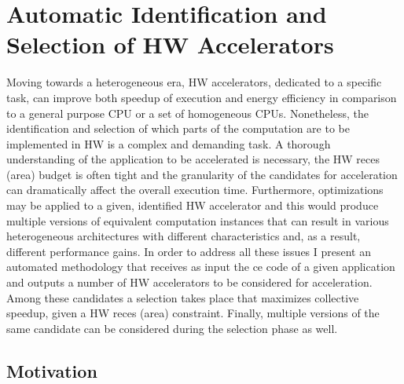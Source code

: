 \documentclass[]{usiinfthesis}
\begin{document}

%
%
%
%
%  
%
%
%
%
%

\chapter%
{Automatic Identification and Selection of HW Accelerators}

Moving towards a heterogeneous era, HW accelerators, dedicated to a specific task, can
improve both speedup of execution and energy efficiency in comparison to a general 
purpose CPU or a set of homogeneous CPUs. Nonetheless, the identification and selection 
of which parts of the computation are to be implemented in HW is a complex and demanding task. 
A thorough understanding of the application to be accelerated is necessary, the HW reces
(area) budget is often tight and the granularity of the candidates for acceleration 
can dramatically affect the overall execution time. Furthermore, optimizations may be applied
to a given, identified HW accelerator and this would produce multiple versions of equivalent
computation instances that can result in various heterogeneous architectures with different
characteristics and, as a result, different performance gains.
In order to address all these issues I present an automated methodology
that receives as input the ce code of a given application and outputs a number of 
HW accelerators to be considered for acceleration. Among these candidates a selection takes 
place that maximizes collective speedup, given a HW reces (area) constraint. Finally, 
multiple versions of the same candidate can be considered during the selection phase as well.

\section{Motivation}
\label{sec:mot}
\end{document}
